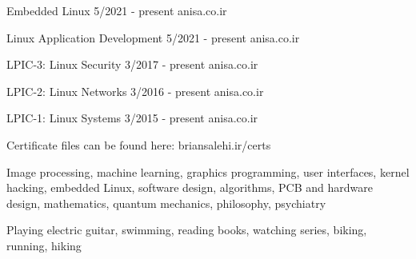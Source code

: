 \documentclass[a4paper,12pt]{memoir} %
\begin{document}
{Embedded Linux}
{5/2021 - present}
{}
{anisa.co.ir}


{Linux Application Development}
{5/2021 - present}
{}
{anisa.co.ir}


{LPIC-3: Linux Security}
{3/2017 - present}
{}
{anisa.co.ir}


{LPIC-2: Linux Networks}
{3/2016 - present}
{}
{anisa.co.ir}


{LPIC-1: Linux Systems}
{3/2015 - present}
{}
{anisa.co.ir}


Certificate files can be found here: briansalehi.ir/certs\par

\Sep %




{Image processing, machine learning, graphics programming, user interfaces, kernel hacking, embedded Linux, software design, algorithms, PCB and hardware design, mathematics, quantum mechanics, philosophy, psychiatry}


{Playing electric guitar, swimming, reading books, watching series, biking, running, hiking}


\Sep %

\end{document}
